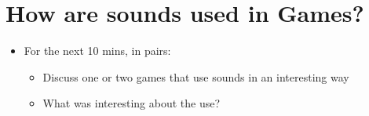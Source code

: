 \part{How are sounds used in Games?}
\frame{\partpage}

\begin{frame}
\begin{itemize}
	\item For the next 10 mins, in pairs:
	\begin{itemize}
		\item Discuss one or two games that use sounds in an interesting way
		\item What was interesting about the use?
	\end{itemize}
\end{itemize}
\end{frame}